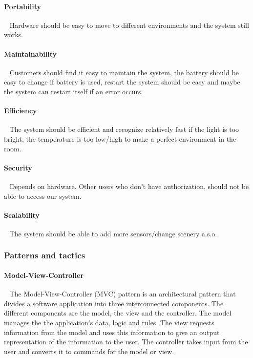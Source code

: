 \documentclass[../document]{subfiles}
\begin{document}
\paragraph{Portability} \ \newline
Hardware should be easy to move to different environments and the system still works.

\paragraph{Maintainability} \ \newline
Customers should find it easy to maintain the system, the battery should be easy to change if battery is used, restart the system should be easy and maybe the system can restart itself if an error occurs. 

\paragraph{Efficiency} \ \newline
The system should be efficient and recognize relatively fast if the light is too bright, the temperature is too low/high to make a perfect environment in the room. 

\paragraph{Security} \ \newline
Depends on hardware. Other users who don't have authorization, should not be able to access our system.

\paragraph{Scalability} \ \newline
The system should be able to add more sensors/change scenery a.s.o.  

\subsubsection{Patterns and tactics}
\paragraph{Model-View-Controller}  \ \newline
The Model-View-Controller (MVC) pattern is an architectural pattern that divides a software application into three interconnected components. The different components are the model, the view and the controller. The model manages the the application’s data, logic and rules. The view requests information from the model and uses this information to give an output representation of the information to the user. The controller takes input from the user and converts it to commands for the model or view. 
\end{document}
